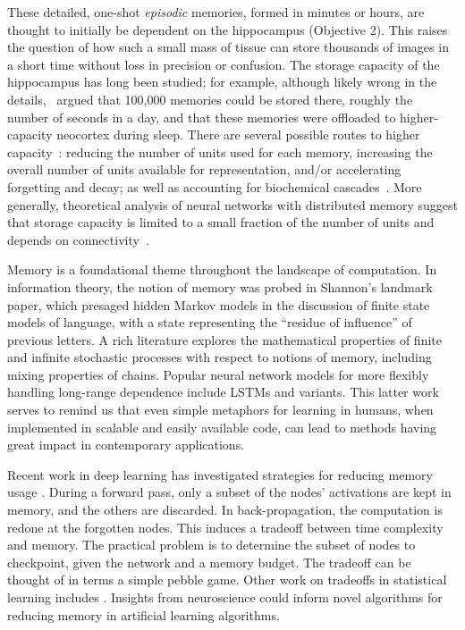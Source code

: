 These detailed, one-shot \textit{episodic} memories,
formed in minutes or hours, are thought to initially be dependent
on the hippocampus (Objective 2). This raises the question of how
such a small mass of tissue can store thousands of images in a
short time without loss in precision or confusion. The 
storage capacity of the hippocampus has long been studied;
for example, although likely wrong in the details,~\citet{Marr:1971} 
argued that 100,000 memories could be
stored there, roughly the number of seconds in a day,
and that these memories were offloaded to higher-capacity
neocortex during sleep. There are
several possible routes to higher capacity~\citep{McNaughton:1987}: reducing the
number of units used for each memory, increasing
the overall number of units available for representation, and/or accelerating
forgetting and decay; as well as accounting for biochemical cascades~\citep{Fusi:2005}.
More generally, theoretical
analysis of neural networks with distributed
memory suggest that storage capacity is limited to a small fraction of the number of units and depends on connectivity~\citep{Hopfield:1982,Brunel:2016}.

\statbackground{} Memory is a foundational theme throughout the
landscape of computation. In information theory, the notion of memory was
probed in Shannon's landmark paper, which presaged hidden Markov
models in the discussion of finite state models of language, with a
state representing the ``residue of influence'' of previous
letters\citep{Shannon:48}. A rich literature 
explores the mathematical properties of finite and infinite stochastic
processes with respect to notions of memory, including mixing
properties of chains\citep{pollard84}. Popular neural network models
for more flexibly handling long-range dependence include LSTMs and
variants\citep{sepp97,gers00}. This latter work serves to
remind us that even simple metaphors for learning in humans, when
implemented in scalable and easily available code, can lead to methods
having great impact in contemporary applications.

Recent work in deep learning has investigated
strategies for reducing memory usage \citep{ChenXZG16}. During a
forward pass, only a subset of the nodes' activations are kept in
memory, and the others are discarded. In back-propagation, the
computation is redone at the forgotten nodes. This induces a tradeoff
between time complexity and memory. The practical problem is to
determine the subset of nodes to checkpoint, given the network and a
memory budget. The tradeoff can be thought of in terms a simple pebble
game. Other work on tradeoffs in statistical learning includes
\citep{lucic15tradeoffs}. Insights from neuroscience could inform novel algorithms for reducing
memory in artificial learning algorithms.

